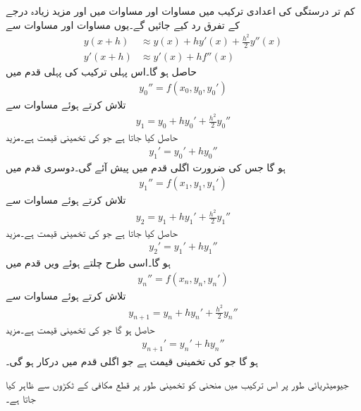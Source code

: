 کم تر درستگی کی اعدادی ترکیب میں مساوات  اور مساوات  میں   اور مزید زیادہ درجے کے تفرق رد کیے جائیں گے۔یوں مساوات  اور مساوات  سے
\begin{align*}
y(x+h) & \approx y(x)+hy'(x)+\tfrac{h^2}{2}y''(x)\\
y'(x+h)&\approx y'(x)+hf''(x)
\end{align*}
حاصل ہو گا۔اس پہلی ترکیب کی پہلی قدم میں
\begin{align*}
y_0''=f(x_0,y_0,y_0')
\end{align*}
تلاش کرتے ہوئے  مساوات  سے
\begin{align*}
y_1=y_0+hy_0'+\tfrac{h^2}{2}y_0''
\end{align*}
حاصل کیا جاتا ہے جو  کی تخمینی قیمت ہے۔مزید
\begin{align*}
y_1'=y_0'+hy_0''
\end{align*}
ہو گا جس کی ضرورت اگلی قدم میں پیش آئے گی۔دوسری قدم میں
\begin{align*}
y_1''=f(x_1,y_1,y_1')
\end{align*}
تلاش کرتے ہوئے مساوات  سے
\begin{align*}
y_2=y_1+hy_1'+\tfrac{h^2}{2}y_1''
\end{align*}
حاصل کیا جاتا ہے جو  کی تخمینی قیمت ہے۔مزید
\begin{align*}
y_2'=y_1'+hy_1''
\end{align*}
ہو گا۔اسی طرح چلتے ہوئے  ویں قدم میں 
\begin{align*}
y_n''=f(x_n,y_n,y_n')
\end{align*}
تلاش کرتے ہوئے مساوات  سے
\begin{align}\label{مساوات_اعدادی_دو_درجی_پہلی_الف}
y_{n+1}=y_n+hy_n'+\tfrac{h^2}{2}y_n''
\end{align}
حاصل ہو گا جو  کی تخمینی قیمت ہے۔مزید
\begin{align}\label{مساوات_اعدادی_دو_درجی_پہلی_ب}
y_{n+1}'=y_n'+hy_n''
\end{align}
ہو گا جو  کی تخمینی قیمت ہے جو  اگلی قدم میں درکار ہو گی۔

جیومیٹریائی طور پر اس ترکیب میں منحنی  کو  تخمینی طور پر قطع مکافی کے ٹکڑوں سے ظاہر کیا جاتا ہے۔  

